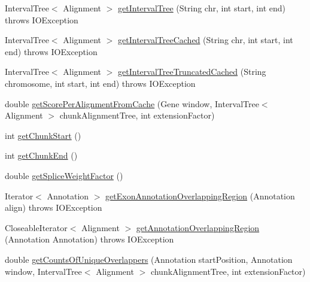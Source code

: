 \begin{DoxyCompactItemize}
\item 
Interval\+Tree$<$ Alignment $>$ \hyperlink{classbroad_1_1pda_1_1seq_1_1segmentation_1_1_alignment_data_model_stats_a052dd0a7ff05cd93ec3dc74f139a4f36}{get\+Interval\+Tree} (String chr, int start, int end)  throws I\+O\+Exception 
\item 
Interval\+Tree$<$ Alignment $>$ \hyperlink{classbroad_1_1pda_1_1seq_1_1segmentation_1_1_alignment_data_model_stats_a81241fd2d415955c7f4081bf6fe3d01b}{get\+Interval\+Tree\+Cached} (String chr, int start, int end)  throws I\+O\+Exception 
\item 
Interval\+Tree$<$ Alignment $>$ \hyperlink{classbroad_1_1pda_1_1seq_1_1segmentation_1_1_alignment_data_model_stats_ac199784edf7f223bf6eac76c6ef23101}{get\+Interval\+Tree\+Truncated\+Cached} (String chromosome, int start, int end)  throws I\+O\+Exception 
\item 
double \hyperlink{classbroad_1_1pda_1_1seq_1_1segmentation_1_1_alignment_data_model_stats_ac91865896814b6d061a12ffa3d578ad3}{get\+Score\+Per\+Alignment\+From\+Cache} (Gene window, Interval\+Tree$<$ Alignment $>$ chunk\+Alignment\+Tree, int extension\+Factor)
\item 
int \hyperlink{classbroad_1_1pda_1_1seq_1_1segmentation_1_1_alignment_data_model_stats_acb34d9f586298e5583d1c113ff1af6b8}{get\+Chunk\+Start} ()
\item 
int \hyperlink{classbroad_1_1pda_1_1seq_1_1segmentation_1_1_alignment_data_model_stats_a8c55306897ad0667ece361ffd2732180}{get\+Chunk\+End} ()
\item 
double \hyperlink{classbroad_1_1pda_1_1seq_1_1segmentation_1_1_alignment_data_model_stats_a9b4d4c4860a95ac5d583333475b845ea}{get\+Splice\+Weight\+Factor} ()
\item 
Iterator$<$ Annotation $>$ \hyperlink{classbroad_1_1pda_1_1seq_1_1segmentation_1_1_alignment_data_model_stats_a3bf75c99feba84ec070c90b94549bb03}{get\+Exon\+Annotation\+Overlapping\+Region} (Annotation align)  throws I\+O\+Exception 
\item 
Closeable\+Iterator$<$ Alignment $>$ \hyperlink{classbroad_1_1pda_1_1seq_1_1segmentation_1_1_alignment_data_model_stats_acacd0e090239a957152168f4e217b675}{get\+Annotation\+Overlapping\+Region} (Annotation Annotation)  throws I\+O\+Exception 
\item 
double \hyperlink{classbroad_1_1pda_1_1seq_1_1segmentation_1_1_alignment_data_model_stats_a72086a8b305719f0ae5b67a7ffd6ed49}{get\+Counts\+Of\+Unique\+Overlappers} (Annotation start\+Position, Annotation window, Interval\+Tree$<$ Alignment $>$ chunk\+Alignment\+Tree, int extension\+Factor)

\end{DoxyCompactItemize}
